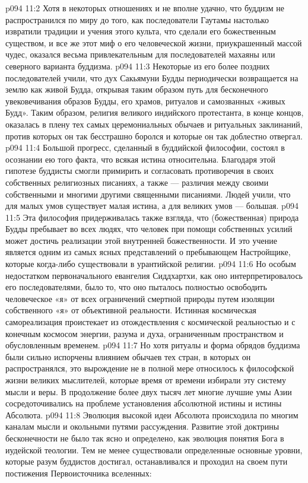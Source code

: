 \vs p094 11:2 \pc Хотя в некоторых отношениях и не вполне удачно, что буддизм не распространился по миру до того, как последователи Гаутамы настолько извратили традиции и учения этого культа, что сделали его божественным существом, и все же этот миф о его человеческой жизни, приукрашенный массой чудес, оказался весьма привлекательным для последователей махаяны или северного варианта буддизма.
\vs p094 11:3 Некоторые из его более поздних последователей учили, что дух Сакьямуни Будды периодически возвращается на землю как живой Будда, открывая таким образом путь для бесконечного увековечивания образов Будды, его храмов, ритуалов и самозванных «живых Будд». Таким образом, религия великого индийского протестанта, в конце концов, оказалась в плену тех самых церемониальных обычаев и ритуальных заклинаний, против которых он так бесстрашно боролся и которые он так доблестно отвергал.
\vs p094 11:4 \pc Большой прогресс, сделанный в буддийской философии, состоял в осознании ею того факта, что всякая истина относительна. Благодаря этой гипотезе буддисты смогли примирить и согласовать противоречия в своих собственных религиозных писаниях, а также --- различия между своими собственными и многими другими священными писаниями. Людей учили, что для малых умов существует малая истина, а для великих умов --- большая.
\vs p094 11:5 Эта философия придерживалась также взгляда, что (божественная) природа Будды пребывает во всех людях, что человек при помощи собственных усилий может достичь реализации этой внутренней божественности. И это учение является одним из самых ясных представлений о пребывающем Настройщике, которые когда\hyp{}либо существовали в урантийской религии.
\vs p094 11:6 Но особым недостатком первоначального евангелия Сиддхартхи, как оно интерпретировалось его последователями, было то, что оно пыталось полностью освободить человеческое «я» от всех ограничений смертной природы путем изоляции собственного «я» от объективной реальности. Истинная космическая самореализация проистекает из отождествления с космической реальностью и с конечным космосом энергии, разума и духа, ограниченным пространством и обусловленным временем.
\vs p094 11:7 Но хотя ритуалы и форма обрядов буддизма были сильно испорчены влиянием обычаев тех стран, в которых он распространялся, это вырождение не в полной мере относилось к философской жизни великих мыслителей, которые время от времени избирали эту систему мысли и веры. В продолжение более двух тысяч лет многие лучшие умы Азии сосредоточивались на проблеме установления абсолютной истины и истины Абсолюта.
\vs p094 11:8 Эволюция высокой идеи Абсолюта происходила по многим каналам мысли и окольными путями рассуждения. Развитие этой доктрины бесконечности не было так ясно и определено, как эволюция понятия Бога в иудейской теологии. Тем не менее существовали определенные основные уровни, которые разум буддистов достигал, останавливался и проходил на своем пути постижения Первоисточника вселенных:
